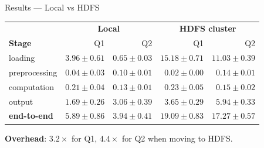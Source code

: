 \documentclass[aspectratio=169]{beamer}
\begin{document}
\begin{frame}{Results --- Local vs HDFS}
\centering
\small
\begin{tabular}{l|rr|rr}
\toprule
& \multicolumn{2}{c|}{\textbf{Local}} & \multicolumn{2}{c}{\textbf{HDFS cluster}}\\
\textbf{Stage} & Q1 & Q2 & Q1 & Q2\\
\midrule
loading       & $3.96 \pm 0.61$ & $0.65 \pm 0.03$ & $15.18 \pm 0.71$ & $11.03 \pm 0.39$\\
preprocessing & $0.04 \pm 0.03$ & $0.10 \pm 0.01$ & $0.02 \pm 0.00$  & $0.14 \pm 0.01$\\
computation   & $0.21 \pm 0.04$ & $0.13 \pm 0.01$ & $0.23 \pm 0.05$  & $0.15 \pm 0.02$\\
output        & $1.69 \pm 0.26$ & $3.06 \pm 0.39$ & $3.65 \pm 0.29$  & $5.94 \pm 0.33$\\
\midrule
\textbf{end-to-end} & $\mathbf{5.89 \pm 0.86}$ & $\mathbf{3.94 \pm 0.41}$ & $\mathbf{19.09 \pm 0.83}$ & $\mathbf{17.27 \pm 0.57}$\\
\bottomrule
\end{tabular}

\vspace{1em}
\textbf{Overhead}: $\mathbf{3.2\times}$ for Q1, $\mathbf{4.4\times}$ for Q2 when moving to HDFS.

\end{frame}
\end{document}
